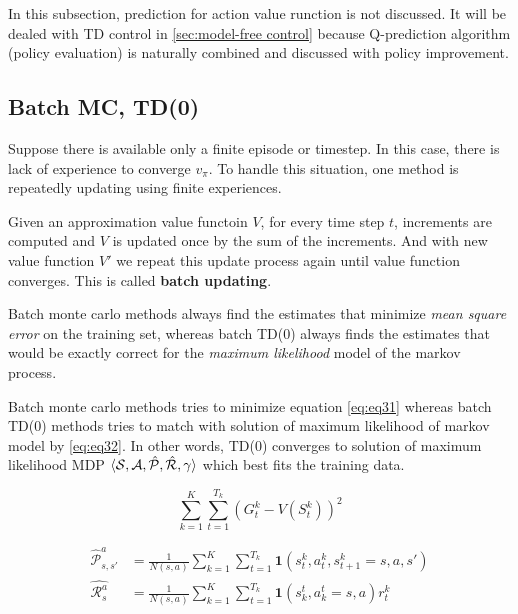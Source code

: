 \documentclass[
	10pt, %
]{article}
\theoremstyle{plain}
\newcommand{\mc}[1]{\mathcal{#1}}
\newcommand{\tb}[1]{\textbf{#1}}
\newcommand{\ti}[1]{\textit{#1}}
\numberwithin{equation}{subsection} %
\begin{document}
In this subsection, prediction for action value runction is not discussed. It will be dealed with TD control in \cref{sec:model-free control} because Q-prediction algorithm (policy evaluation) is naturally combined and discussed with policy improvement.

\subsection{Batch MC, TD(0)}
Suppose there is available only a finite episode or timestep. In this case, there is lack of experience to converge $v_\pi$. To handle this situation, one method is repeatedly updating using finite experiences.

Given an approximation value functoin $V$, for every time step $t$, increments are computed and $V$ is updated once by the sum of the increments. And with new value function $V'$ we repeat this update process again until value function converges. This is called \tb{batch updating}. 

Batch monte carlo methods always find the estimates that minimize \ti{mean square error} on the training set, whereas batch TD(0) always finds the estimates that would be exactly correct for the \ti{maximum likelihood} model of the markov process.

Batch monte carlo methods tries to minimize equation \cref{eq:eq31} whereas batch TD(0) methods tries to match with solution of maximum likelihood of markov model by \cref{eq:eq32}. In other words, TD(0) converges to solution of maximum likelihood MDP $\braket{\mc{S,A,\hat{P}, \hat{R}},\gamma}$ which best fits the training data.

\begin{equation} \label{eq:eq31}
    \sum^K_{k=1} \sum^{T_k}_{t=1} \left(G^k_t - V(S^k_t)\right)^2
\end{equation}

\begin{equation} \label{eq:eq32}
    \begin{aligned}
        \hat{\mc{P}}^a_{s,s'} &= \frac{1}{N(s,a)} \sum^K_{k=1} \sum^{T_k}_{t=1}\mathbf{1}(s^k_t,a^k_t,s^k_{t+1} = s, a, s')\\
        \hat{\mc{R}^a_s} &= \frac{1}{N(s,a)} \sum^K_{k=1} \sum^{T_k}_{t=1}\mathbf{1}(s^t_k,a^t_k = s,a)r^k_t
    \end{aligned}
\end{equation}
\end{document}

